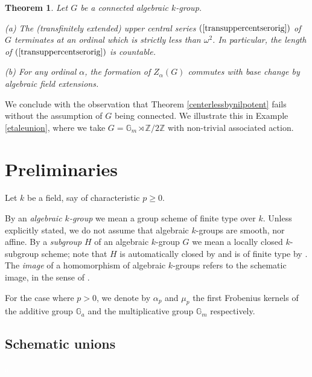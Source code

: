 \documentclass[twoside,a4paper,reqno,11pt]{amsart}
\newtheorem{theorem}{Theorem}[section]
\theoremstyle{definition}
\begin{document}
\begin{theorem}\label{UCSterminatesthm} Let $G$ be a connected algebraic $k$-group.

\vspace{1mm}\noindent (a) The (transfinitely extended) upper central series $(\ref{transuppercentserorig})$ of $G$ terminates at an ordinal which is strictly less than $\omega^2$. %
In particular, the length of $(\ref{transuppercentserorig})$ is countable.

\vspace{1mm}\noindent (b) For any ordinal $\alpha$, the formation of $Z_\alpha(G)$ commutes with base change by algebraic field extensions.
\end{theorem}

\noindent We conclude with the observation that Theorem \ref{centerlessbynilpotent} fails without the assumption of $G$ being connected. We illustrate this in Example \ref{etaleunion}, where we take $G=\mathbb{G}_m\rtimes\mathbb{Z}/2\mathbb{Z}$ with non-trivial associated action.




\section{Preliminaries}\label{preliminaries}

\noindent Let $k$ be a field, say of characteristic $p\geq 0$. 

\vspace{2mm}\noindent By an \textit{algebraic $k$-group} we mean a group scheme of finite type over $k$. Unless explicitly stated, we do not assume that algebraic $k$-groups are smooth, nor affine. By a \textit{subgroup} $H$ of an algebraic $k$-group $G$ we mean a locally closed $k$-subgroup scheme; note that $H$ is automatically closed by \cite[047T]{Stacks} and is of finite type by \cite[01T5, 01T3]{Stacks}. The \textit{image} of a homomorphism of algebraic $k$-groups refers to the schematic image, in the sense of \cite[01R7]{Stacks}.

\vspace{2mm}\noindent For the case where $p>0$, we denote by $\alpha_p$ and $\mu_p$ the first Frobenius kernels of the additive group $\mathbb{G}_a$ and the multiplicative group $\mathbb{G}_m$ respectively.

\subsection{Schematic unions}\label{schunions}\textcolor{white}{a}
\end{document}
